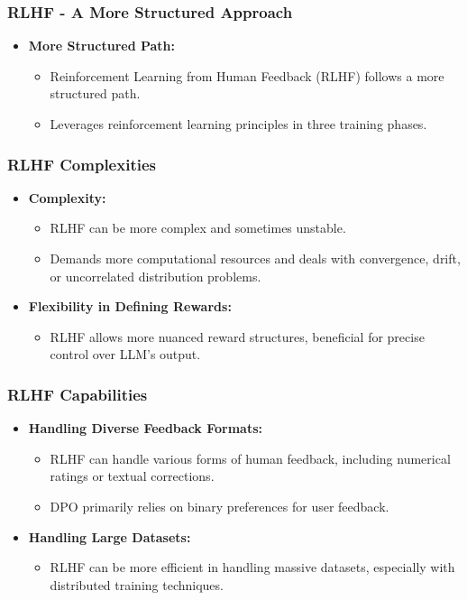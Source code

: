 \begin{frame}[fragile]\frametitle{RLHF - A More Structured Approach}
  \begin{itemize}
    \item \textbf{More Structured Path:}
      \begin{itemize}
        \item Reinforcement Learning from Human Feedback (RLHF) follows a more structured path.
        \item Leverages reinforcement learning principles in three training phases.
      \end{itemize}
  \end{itemize}
\end{frame}


\begin{frame}[fragile]\frametitle{RLHF Complexities}
  \begin{itemize}
    \item \textbf{Complexity:}
      \begin{itemize}
        \item RLHF can be more complex and sometimes unstable.
        \item Demands more computational resources and deals with convergence, drift, or uncorrelated distribution problems.
      \end{itemize}
    \item \textbf{Flexibility in Defining Rewards:}
      \begin{itemize}
        \item RLHF allows more nuanced reward structures, beneficial for precise control over LLM's output.
      \end{itemize}
  \end{itemize}
\end{frame}

\begin{frame}[fragile]\frametitle{RLHF Capabilities}
  \begin{itemize}
    \item \textbf{Handling Diverse Feedback Formats:}
      \begin{itemize}
        \item RLHF can handle various forms of human feedback, including numerical ratings or textual corrections.
        \item DPO primarily relies on binary preferences for user feedback.
      \end{itemize}
    \item \textbf{Handling Large Datasets:}
      \begin{itemize}
        \item RLHF can be more efficient in handling massive datasets, especially with distributed training techniques.
      \end{itemize}
  \end{itemize}
\end{frame}

